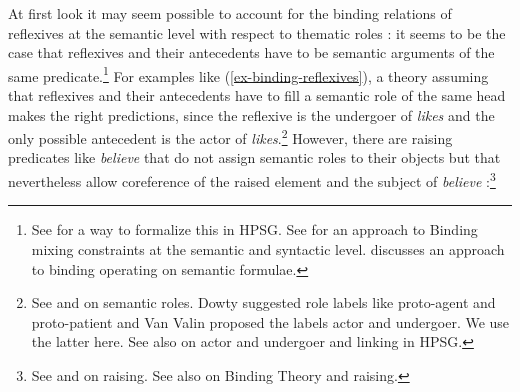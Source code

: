 \documentclass[output=paper,biblatex,babelshorthands,newtxmath,draftmode,colorlinks,citecolor=brown]{langscibook}
\begin{document}
At first look it may seem possible to account for the binding relations of reflexives at the
semantic level with respect to thematic roles \parencites[Section~4.10]{Jackendoff72a-u}{Wilkins1988a-u}[Chapter~6]{Williams1994a-u}:
it seems to be the case that reflexives and their antecedents have to be semantic
arguments of the same predicate.\footnote{%
  See \citet{Riezler95a} for a way to formalize this in HPSG. See  for an approach to
  Binding mixing constraints at the semantic and syntactic level.
 discusses an approach to binding operating on
semantic formulae.%
} For examples like (\ref{ex-binding-reflexives}), a theory assuming that reflexives and their antecedents have to
fill a semantic role of the same head makes the right predictions,
since the reflexive is the undergoer of \emph{likes} and the only possible antecedent is the actor of
\emph{likes}.\footnote{
  See  and  on semantic roles. Dowty suggested role labels like
  proto-agent and proto-patient and Van Valin proposed the labels actor and undergoer. We use the latter
  here. See also  on
  actor and undergoer and linking in HPSG.
} However, there are raising predicates like \emph{believe} that do not assign semantic roles
to their objects but that nevertheless allow coreference of the raised element and the subject of
\emph{believe} \citep[]{MS98a}:\footnote{%
 See  and  on raising. See also  on Binding
 Theory and raising.%
}
\end{document}
